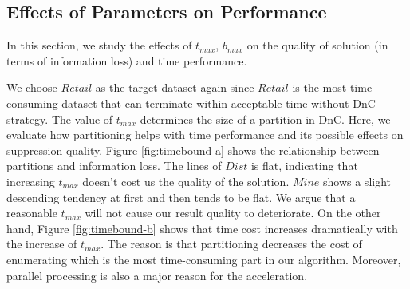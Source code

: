 \subsection{Effects of Parameters on Performance}\label{sec:eval:effect}
In this section, 
we study the effects of $t_{max}$, $b_{max}$ on the
quality of solution (in terms of information loss) and time performance.

We choose $Retail$ as the target dataset again since $Retail$
is the most time-consuming dataset that can terminate within
acceptable time without DnC strategy.
The value of $t_{max}$ determines the size of a partition in DnC. 
Here, we evaluate how partitioning helps with time performance and
its possible effects on suppression quality.
Figure \ref{fig:timebound-a} shows the relationship between partitions
and information loss. The lines of  $Dist$ is flat, indicating that
increasing $t_{max}$ doesn't cost us the quality of the solution. $Mine$
shows a slight descending tendency at first and then tends to be flat.
We argue that a reasonable $t_{max}$ will not cause our result quality to
deteriorate.
On the other hand, Figure \ref{fig:timebound-b} shows that
time cost increases dramatically  with the increase of  $t_{max}$.
The reason is that partitioning decreases the cost of enumerating \qids which
is the most time-consuming part in our algorithm. Moreover, parallel
processing is also a major reason for the acceleration.

